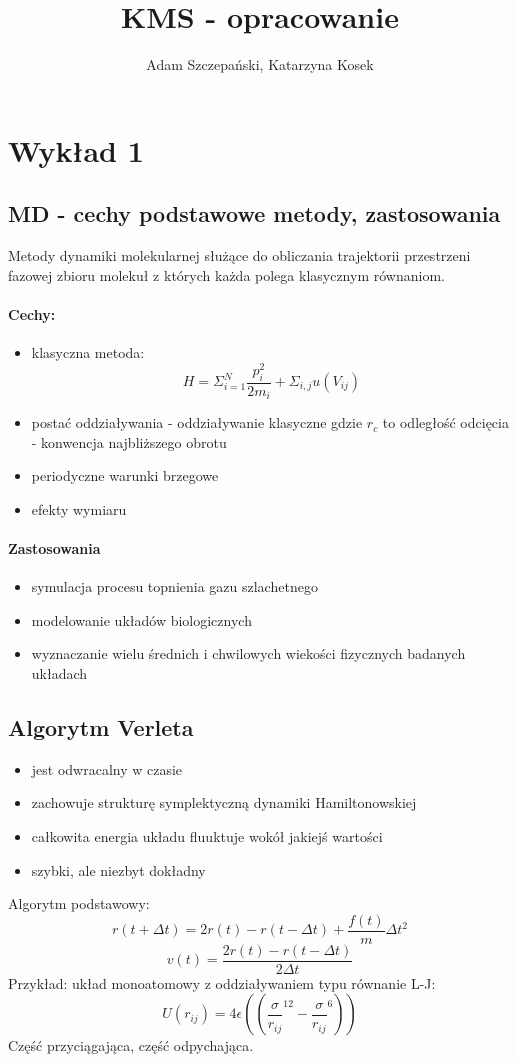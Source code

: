 \documentclass{article}
\title{KMS - opracowanie}
\author{Adam Szczepański, Katarzyna Kosek}
\begin{document}
		\maketitle
		\newpage
	\section{Wykład 1}
		\subsection{MD - cechy podstawowe metody, zastosowania}
		Metody dynamiki molekularnej służące do obliczania trajektorii przestrzeni fazowej zbioru molekuł z których każda polega klasycznym równaniom.
        \paragraph{Cechy:} 
        \begin{itemize}
            \item klasyczna metoda: 
            $$H = \Sigma_{i=1}^N\frac{p_i^2}{2m_i} + \Sigma_{i,j}u(V_{ij})$$
            \item postać oddziaływania - oddziaływanie klasyczne gdzie $r_c$ to odległość odcięcia - konwencja najbliższego obrotu
            \item periodyczne warunki brzegowe
            \item efekty wymiaru
        \end{itemize}
        \paragraph{Zastosowania}
        \begin{itemize}
            \item symulacja procesu topnienia gazu szlachetnego
            \item modelowanie układów biologicznych
            \item wyznaczanie wielu średnich i chwilowych wiekości fizycznych  badanych układach
        \end{itemize}
        \subsection{Algorytm Verleta}
        \begin{itemize}
	        \item jest odwracalny w czasie
	        \item zachowuje strukturę symplektyczną dynamiki Hamiltonowskiej
	        \item całkowita energia układu fluuktuje wokół jakiejś wartości
	        \item szybki, ale niezbyt dokładny
	    \end{itemize}
	    Algorytm podstawowy:
	    $$r(t + \Delta t) = 2r(t) - r(t - \Delta t) + \frac{f(t)}{m}\Delta t^2$$
	    $$v(t) = \frac{2r(t) - r(t - \Delta t)}{2\Delta t}$$
        Przykład: układ monoatomowy z oddziaływaniem typu równanie L-J:
        $$U(r_{ij}) = 4\epsilon((\frac{\sigma}{r_{ij}}^{12} - \frac{\sigma}{r_{ij}}^{6	}))$$
		Część przyciągająca, część odpychająca.
\end{document}
